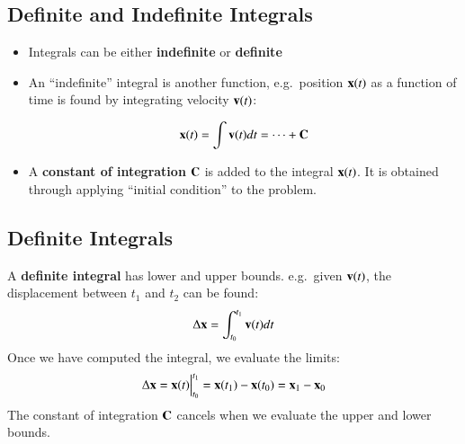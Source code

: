 \documentclass{../../oss-handout}
\newcommand{\mb}[1]{\ensuremath\mathbf{#1}}
\begin{document}
\subsection{Definite and Indefinite Integrals}

\begin{itemize}
\item Integrals can be either \textbf{indefinite} or \textbf{definite}
\item An ``indefinite'' integral is another function, e.g.\ position
  $\mb{x}(t)$ as a function of time is found by integrating velocity
  $\mb{v}(t)$:

  \begin{equation*}
    \mb{x}(t)=\int\mb{v}(t)dt=\cdots+\mb{C}
  \end{equation*}
\item A \textbf{constant of integration} $\mb{C}$ is added to the integral
  $\mb{x}(t)$. It is obtained through applying ``initial condition'' to the
  problem.
\end{itemize}


\subsection{Definite Integrals}

A \textbf{definite integral} has lower and upper bounds. e.g.\ given
$\mb{v}(t)$, the displacement between $t_1$ and $t_2$ can be found:
\begin{equation*}
  \Delta\mb{x}=\int_{t_0}^{t_1} \mb{v}(t)dt
\end{equation*}
Once we have computed the integral, we evaluate the limits:
\begin{equation*}
  \Delta\mb{x} =
  \mb{x}(t)\Big|^{t_1}_{t_0}=
  \mb{x}(t_1)-\mb{x}(t_0)=
  \mb{x}_1-\mb{x}_0
\end{equation*}
The constant of integration $\mb{C}$ cancels when we evaluate the upper and
lower bounds.
\end{document}
